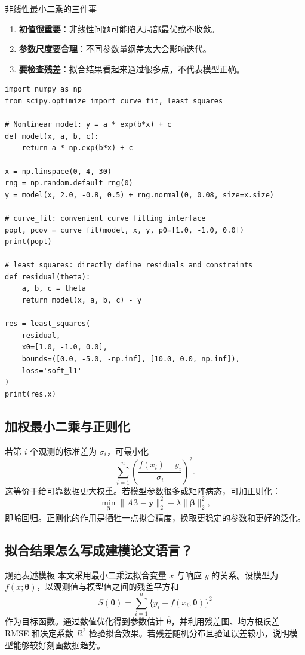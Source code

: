 \documentclass[11pt,a4paper]{ctexart}
\begin{document}
\begin{warnbox}{非线性最小二乘的三件事}
\begin{enumerate}[label=\arabic*)]
  \item \textbf{初值很重要}：非线性问题可能陷入局部最优或不收敛。
  \item \textbf{参数尺度要合理}：不同参数量纲差太大会影响迭代。
  \item \textbf{要检查残差}：拟合结果看起来通过很多点，不代表模型正确。
\end{enumerate}
\end{warnbox}

\begin{lstlisting}
import numpy as np
from scipy.optimize import curve_fit, least_squares

# Nonlinear model: y = a * exp(b*x) + c
def model(x, a, b, c):
    return a * np.exp(b*x) + c

x = np.linspace(0, 4, 30)
rng = np.random.default_rng(0)
y = model(x, 2.0, -0.8, 0.5) + rng.normal(0, 0.08, size=x.size)

# curve_fit: convenient curve fitting interface
popt, pcov = curve_fit(model, x, y, p0=[1.0, -1.0, 0.0])
print(popt)

# least_squares: directly define residuals and constraints
def residual(theta):
    a, b, c = theta
    return model(x, a, b, c) - y

res = least_squares(
    residual,
    x0=[1.0, -1.0, 0.0],
    bounds=([0.0, -5.0, -np.inf], [10.0, 0.0, np.inf]),
    loss='soft_l1'
)
print(res.x)
\end{lstlisting}

\subsection{加权最小二乘与正则化}

若第 $i$ 个观测的标准差为 $\sigma_i$，可最小化
\[
  \sum_{i=1}^n\left(\frac{f(x_i)-y_i}{\sigma_i}\right)^2.
\]
这等价于给可靠数据更大权重。若模型参数很多或矩阵病态，可加正则化：
\[
  \min_{\bm\beta}\|A\bm\beta-\bm y\|_2^2+\lambda\|\bm\beta\|_2^2,
\]
即岭回归。正则化的作用是牺牲一点拟合精度，换取更稳定的参数和更好的泛化。

\subsection{拟合结果怎么写成建模论文语言？}

\begin{stepbox}{规范表述模板}
本文采用最小二乘法拟合变量 $x$ 与响应 $y$ 的关系。设模型为 $f(x;\bm\theta)$，以观测值与模型值之间的残差平方和
\[
S(\bm\theta)=\sum_{i=1}^{n}\{y_i-f(x_i;\bm\theta)\}^2
\]
作为目标函数。通过数值优化得到参数估计 $\hat{\bm\theta}$，并利用残差图、均方根误差 RMSE 和决定系数 $R^2$ 检验拟合效果。若残差随机分布且验证误差较小，说明模型能够较好刻画数据趋势。
\end{stepbox}
\end{document}

